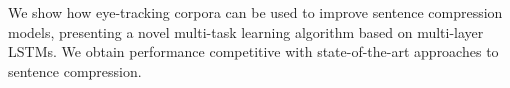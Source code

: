 We show how eye-tracking corpora can be used to improve sentence compression models, presenting a novel multi-task learning algorithm based on multi-layer LSTMs. We obtain performance competitive with state-of-the-art approaches to sentence compression.
